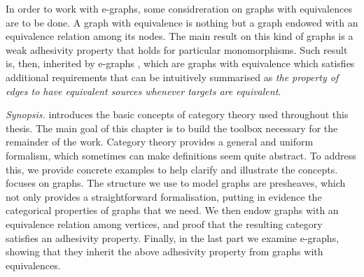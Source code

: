 In order to work with e-graphs, some considreration on graphs with equivalences are to be done. 
A graph with equivalence is nothing but a graph endowed with an equivalence relation among its nodes. 
The main result on this kind of graphs is a weak adhesivity property that holds for particular monomorphisms. 
Such result is, then, inherited by e-graphs , 
which are graphs with equivalence which satisfies additional requirements that can be intuitively summarised 
as \textit{the property of edges to have equivalent sources whenever targets are equivalent}.
\fi 

\smallskip \emph{Synopsis.}  introduces the basic concepts of category theory used throughout this thesis. The main goal of this chapter is to build the toolbox necessary for the remainder of the work. Category theory provides a general and uniform formalism, which sometimes can make definitions seem quite abstract. To address this, we provide concrete examples to help clarify and illustrate the concepts.
 focuses on graphs. The structure we  use to model graphs are presheaves, which not only provides a straightforward formalisation, putting in evidence the categorical properties of graphs that we  need.  We then endow graphs with an equivalence relation among vertices, and proof that the resulting category satisfies an adhesivity property. Finally, in the last part we examine
 e-graphs, showing that they inherit the above adhesivity property from graphs with equivalences.


